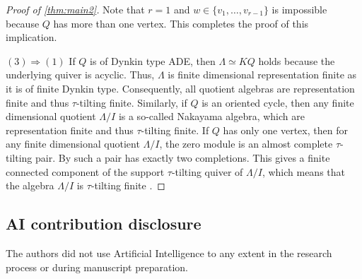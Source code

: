 \documentclass[11pt]{amsart}
\theoremstyle{definition}
\begin{document}
\begin{proof}[Proof of \cref{thm:main2}]
Note that $r=1$ and $w \in \{ v_1, \dots, v_{r-1}\}$ is impossible because $Q$ has more than one vertex. This completes the proof of this implication.

$(3) \Rightarrow (1)$ If $Q$ is of Dynkin type ADE, then $\Lambda \simeq KQ$ holds because the underlying quiver is acyclic. Thus, $\Lambda$ is finite dimensional representation finite as it is of finite Dynkin type. Consequently, all quotient algebras are representation finite and thus $\tau$-tilting finite. Similarly, if $Q$ is an oriented cycle, then any finite dimensional quotient $\Lambda/I$ is a so-called Nakayama algebra, which are representation finite \cite[Thm. V.3.5]{assem_skowronski_simson_2006} and thus $\tau$-tilting finite. If $Q$ has only one vertex, then for any finite dimensional quotient $\Lambda/I$, the zero module is an almost complete $\tau$-tilting pair. By \cite[Thm. 0.4]{tau} such a pair has exactly two completions. This gives a finite connected component of the support $\tau$-tilting quiver of $\Lambda/I$, which means that the algebra $\Lambda/I$ is $\tau$-tilting finite \cite[Cor. 2.38]{tau}. 
\end{proof}


\subsection*{AI contribution disclosure}
The authors did not use Artificial Intelligence to any extent in the research process or during manuscript preparation.



\printbibliography
\end{document}
